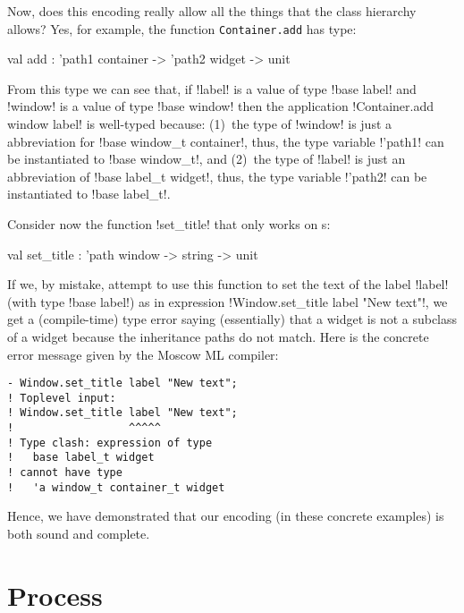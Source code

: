 \documentclass[workingdraft]{usetex-v1}
\begin{document}
Now, does this encoding really allow all the things that the class
hierarchy allows?  Yes, for example, the function
\texttt{Container.add} has type:
\begin{SMLcode}
val add : 'path1 container -> 'path2 widget 
                                    -> unit
\end{SMLcode}
From this type we can see that, if !label! is a value of type 
%
!base label! 
% 
and !window! is a value of type !base window! then
the application
%
!Container.add window label!
%
is well-typed because: (1)~the type of !window! is just a abbreviation for 
%
!base window_t container!,
%
thus, the type variable !'path1! can be instantiated to 
%
!base window_t!,
% 
and (2)~the type of !label! is just an abbreviation of 
%
!base label_t widget!,
%
thus, the type variable !'path2! can be instantiated to 
%
!base label_t!.

Consider now the function !set_title! that only works on s:
\begin{SMLcode}
val set_title : 'path window -> string 
                               -> unit
\end{SMLcode}
If we, by mistake, attempt to use this function to set the text of the
label !label! (with type !base label!) as in expression
%
!Window.set_title label "New text"!, 
%
we get a (compile-time) type error saying (essentially) that a
 widget is not a subclass of a 
widget because the inheritance paths do not match.  Here is the
concrete error message given by the Moscow ML compiler:
\begin{verbatim}
- Window.set_title label "New text";
! Toplevel input:
! Window.set_title label "New text";
!                  ^^^^^
! Type clash: expression of type
!   base label_t widget
! cannot have type
!   'a window_t container_t widget
\end{verbatim}

Hence, we have demonstrated that our encoding (in these concrete
examples) is both sound and complete.




\section{Process}
\label{sec:process}
\end{document}
